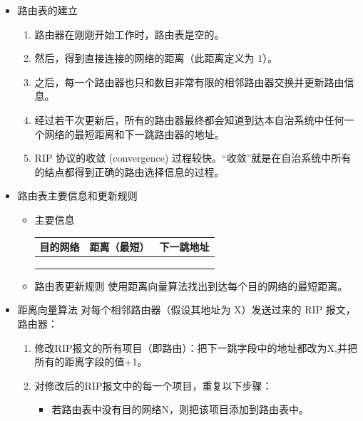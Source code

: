 \documentclass[11pt]{article}
\begin{document}
\begin{enumerate}
\begin{enumerate}
\begin{itemize}
\begin{enumerate}
\item 交换的信息是当前本路由器所知道的全部信息，即自己的路由表。

\item 按固定时间间隔交换路由信息，例如，每隔 30 秒。当网络拓扑发生变化时，路由器也及时向相邻路由器通告拓扑变化后的路由信息。
\end{enumerate}

\item 路由表的建立
\begin{enumerate}
\item 路由器在刚刚开始工作时，路由表是空的。

\item 然后，得到直接连接的网络的距离（此距离定义为 1）。

\item 之后，每一个路由器也只和数目非常有限的相邻路由器交换并更新路由信息。

\item 经过若干次更新后，所有的路由器最终都会知道到达本自治系统中任何一个网络的最短距离和下一跳路由器的地址。

\item RIP 协议的收敛 (convergence) 过程较快。“收敛”就是在自治系统中所有的结点都得到正确的路由选择信息的过程。
\end{enumerate}
\item 路由表主要信息和更新规则
\begin{itemize}
\item 主要信息
\begin{center}
\begin{tabular}{lll}
目的网络 & 距离（最短） & 下一跳地址\\[0pt]
\hline
 &  & \\[0pt]
 &  & \\[0pt]
 &  & \\[0pt]
\end{tabular}
\end{center}
\item 路由表更新规则
使用距离向量算法找出到达每个目的网络的最短距离。
\end{itemize}

\item 距离向量算法
对每个相邻路由器（假设其地址为 X）发送过来的 RIP 报文，路由器：
\begin{enumerate}
\item 修改RIP报文的所有项目（即路由）：把下一跳字段中的地址都改为X,并把所有的距离字段的值+1。

\item 对修改后的RIP报文中的每一个项目，重复以下步骤：
\begin{itemize}
\item 若路由表中没有目的网络N，则把该项目添加到路由表中。


\end{itemize}
\end{enumerate}
\end{itemize}
\end{enumerate}
\end{enumerate}
\end{document}
